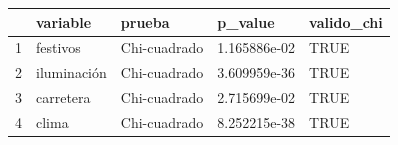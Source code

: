 \begin{table}[ht]
\centering
\begin{tabular}{rllll}
  \hline
 & variable & prueba & p\_value & valido\_chi \\ 
  \hline
1 & festivos & Chi-cuadrado & 1.165886e-02 & TRUE \\ 
  2 & iluminación & Chi-cuadrado & 3.609959e-36 & TRUE \\ 
  3 & carretera & Chi-cuadrado & 2.715699e-02 & TRUE \\ 
  4 & clima & Chi-cuadrado & 8.252215e-38 & TRUE \\ 
   \hline
\end{tabular}
\end{table}
